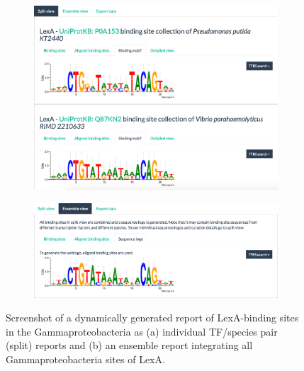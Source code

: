 \begin{figure}
  \centering
  \begin{subfigure}{0.9\textwidth}
  \includegraphics[width=1\textwidth]{figures/chapter2/report-split-view}
  \caption{}
  \end{subfigure}

  \begin{subfigure}{0.9\textwidth}
  \includegraphics[width=1\textwidth]{figures/chapter2/report-ensemble-view}
  \caption{}
  \end{subfigure}

  \caption{Screenshot of a dynamically generated report of LexA-binding sites
    in the Gammaproteobacteria as (a) individual TF/species pair (split)
    reports and (b) an ensemble report integrating all Gammaproteobacteria
    sites of LexA.}
\label{fig:motif-reports}
\end{figure}

